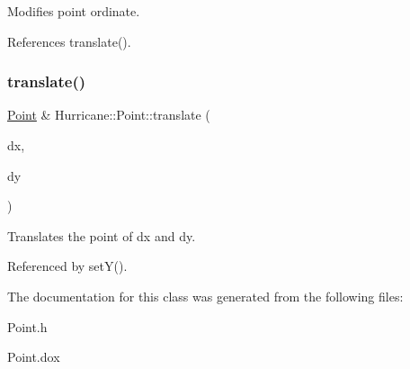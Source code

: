 Modifies point ordinate. 

References translate().

\mbox{\label{classHurricane_1_1Point_a86d908d60346bc15f1af4e96eddbdb19}} 
\subsubsection{\texorpdfstring{translate()}{translate()}}
{\footnotesize\ttfamily \hyperlink{classHurricane_1_1Point}{Point} \& Hurricane\+::\+Point\+::translate (\begin{DoxyParamCaption}\item[{const \hyperlink{group__DbUGroup_ga4fbfa3e8c89347af76c9628ea06c4146}{Db\+U\+::\+Unit} \&}]{dx,  }\item[{const \hyperlink{group__DbUGroup_ga4fbfa3e8c89347af76c9628ea06c4146}{Db\+U\+::\+Unit} \&}]{dy }\end{DoxyParamCaption})}

Translates the point of dx and dy. 

Referenced by set\+Y().



The documentation for this class was generated from the following files\+:\begin{DoxyCompactItemize}
\item 
Point.\+h\item 
Point.\+dox\end{DoxyCompactItemize}
